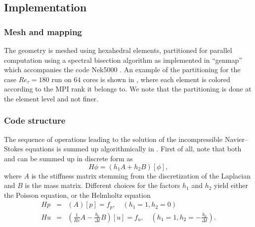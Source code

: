 \documentclass{sig-alternate}
\begin{document}


\subsection{Implementation}
\label{sec:implementation}

\subsubsection{Mesh and mapping}
\label{sec:code}

The geometry is meshed using hexahedral elements, partitioned for parallel
computation using a spectral bisection algorithm as implemented in ``genmap''
which accompanies the code Nek5000 \cite{argonne:nekdoc}. An example of the
partitioning for the case $Re_{\tau} = 180$ run on $64$ cores is shown in , where each element is colored according to the MPI rank it belongs to. We note that the partitioning is done at the element level and not finer.
 
\subsubsection{Code structure}
\label{sec:code}

The sequence of operations leading to the solution of the incompressible
Navier--Stokes equations is summed up algorithmically in .  
First of all, note that both  and  can be summed up in discrete form as
$$H \phi=(h_1 A+h_2 B)[\phi],$$
where $A$ is the stiffness matrix stemming from the discretization of the Laplacian and $B$ is the mass matrix. 
Different choices for the factors $h_1$ and $h_2$ yield either the Poisson equation, or the Helmholtz equation
\begin{eqnarray}
Hp &=& (A)[p]=f_p, \quad (h_1=1, h_2=0)\\
Hu &=&(\frac{1}{Re}A -\frac{b_0}{\Delta t} B )[u]=f_u, \quad (h_1=1, h_2=-\frac{b_0}{\Delta t}).
\end{eqnarray}
\end{document}
